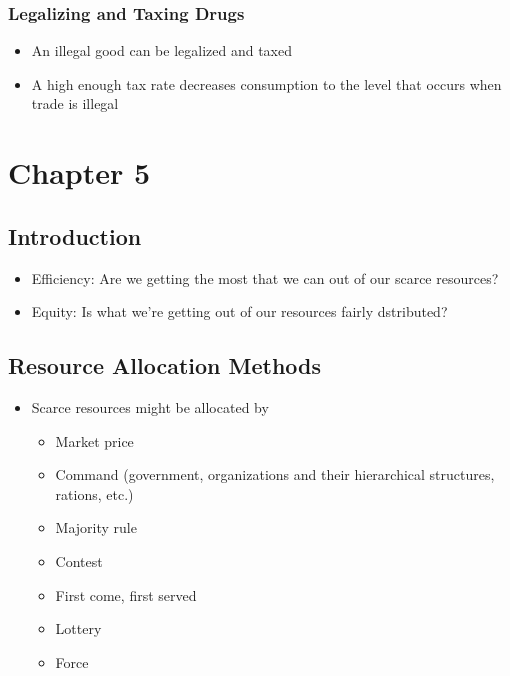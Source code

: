 \documentclass[11pt]{article}
\begin{document}
\subsubsection{Legalizing and Taxing Drugs}
\label{sec:org5f8419c}
\begin{itemize}
\item An illegal good can be legalized and taxed
\item A high enough tax rate decreases consumption to the level that occurs when trade is illegal
\end{itemize}
\section{Chapter 5}
\label{sec:org47d5bf3}
\subsection{Introduction}
\label{sec:org71b5e79}
\begin{itemize}
\item Efficiency: Are we getting the most that we can out of our scarce resources?
\item Equity: Is what we're getting out of our resources fairly dstributed?
\end{itemize}
\subsection{Resource Allocation Methods}
\label{sec:org7344aa7}
\begin{itemize}
\item Scarce resources might be allocated by
\begin{itemize}
\item Market price
\item Command (government, organizations and their hierarchical structures, rations, etc.)
\item Majority rule
\item Contest
\item First come, first served
\item Lottery
\item Force
\end{itemize}
\end{itemize}
\end{document}
